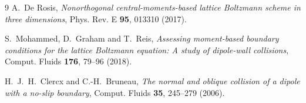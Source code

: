 \documentclass[11pt,a4paper]{article}
\begin{document}
\begin{thebibliography}{9}
 A.~De Rosis,
  \emph{Nonorthogonal central-moments-based lattice Boltzmann scheme in three
  dimensions}, Phys. Rev. E \textbf{95}, 013310 (2017).

 S.~Mohammed, D.~Graham and T.~Reis,
  \emph{Assessing moment-based boundary conditions for the lattice Boltzmann
  equation: A study of dipole-wall collisions},
  Comput. Fluids \textbf{176}, 79--96 (2018).

 H.~J.~H.~Clercx and C.-H.~Bruneau,
  \emph{The normal and oblique collision of a dipole with a no-slip boundary},
  Comput. Fluids \textbf{35}, 245--279 (2006).

\end{thebibliography}
\end{document}
